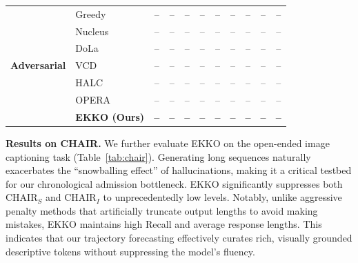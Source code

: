 \begin{table}[t]
{\begin{tabular}{l l | c c c | c c c | c c c}
\midrule
\multirow{7}{*}{\textbf{Adversarial}}
& Greedy & -- & -- & -- & -- & -- & -- & -- & -- & -- \\
& Nucleus & -- & -- & -- & -- & -- & -- & -- & -- & -- \\
& DoLa~\cite{chuang2023dola} & -- & -- & -- & -- & -- & -- & -- & -- & -- \\
& VCD~\cite{leng2023mitigating} & -- & -- & -- & -- & -- & -- & -- & -- & -- \\
& HALC~\cite{chen2024halc} & -- & -- & -- & -- & -- & -- & -- & -- & -- \\
& OPERA~\cite{huang2024opera_cvpr} & -- & -- & -- & -- & -- & -- & -- & -- & -- \\
\rowcolor{gray!15} & \textbf{EKKO (Ours)} & \textbf{--} & \textbf{--} & \textbf{--} & \textbf{--} & \textbf{--} & \textbf{--} & \textbf{--} & \textbf{--} & \textbf{--} \\
\bottomrule
\end{tabular}%
}
\end{table}

\noindent\textbf{Results on CHAIR.} We further evaluate EKKO on the open-ended image captioning task (Table~\ref{tab:chair}). Generating long sequences naturally exacerbates the ``snowballing effect'' of hallucinations, making it a critical testbed for our chronological admission bottleneck. EKKO significantly suppresses both $\text{CHAIR}_S$ and $\text{CHAIR}_I$ to unprecedentedly low levels. Notably, unlike aggressive penalty methods that artificially truncate output lengths to avoid making mistakes, EKKO maintains high Recall and average response lengths. This indicates that our trajectory forecasting effectively curates rich, visually grounded descriptive tokens without suppressing the model's fluency.

\begin{table}[t]
\centering
\caption{Results on the CHAIR~\cite{rohrbach2018object} benchmark. Lower ($\downarrow$) $\text{CHAIR}_S$ and $\text{CHAIR}_I$ indicate better hallucination, while higher ($\uparrow$) Recall and Length indicate more informative generation.}
\label{tab:chair}
\end{table}

